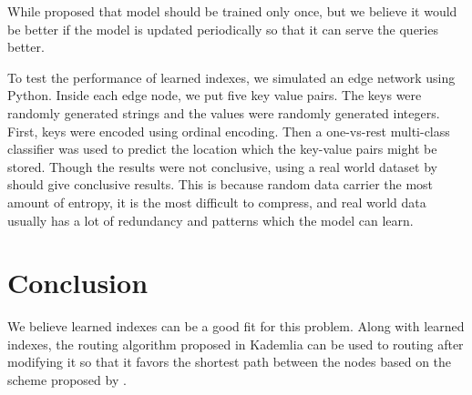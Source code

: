 While \citet{kraskaCaseLearnedIndex2018} proposed that model should be trained
only once, but we believe it would be better if the model is updated
periodically so that it can serve the queries better.

To test the performance of learned indexes, we simulated an edge network using
Python. Inside each edge node, we put five key value pairs. The keys were
randomly generated strings and the values were randomly generated integers.
First, keys were encoded using ordinal encoding. Then a one-vs-rest multi-class
classifier was used to predict the location which the key-value pairs might be
stored. Though the results were not conclusive, using a real
world dataset by \citet{taxi&limousinecommissionNewYorkTaxi} should give
conclusive results. This is because random data carrier the most amount of
entropy, it is the most difficult to compress, and real world data usually has a
lot of redundancy and patterns which the model can learn.

\section{Conclusion}

We believe learned indexes can be a good fit for this problem. Along with
learned indexes, the routing algorithm proposed in Kademlia can be used to
routing after modifying it so that it favors the shortest path between the nodes
based on the scheme proposed by \citet{mengweiImprovementKademliaBased2013}.